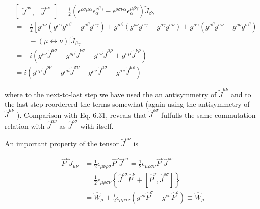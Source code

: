 \documentclass[10pt, letterpaper]{article}
\begin{document}
$$
\begin{aligned}
& {\left[\begin{array}{ll}
\tilde{J}^{\rho \sigma}, & \hat{J}^{\mu \nu}
\end{array}\right]=\frac{i}{2}\left(\epsilon^{\rho \sigma \mu \alpha} \epsilon_{\alpha}^{\nu \beta \gamma}-\epsilon^{\rho \sigma \nu \alpha} \epsilon_{\alpha}^{\mu \beta \gamma}\right) \tilde{J}_{\beta \gamma}} \\
& =-\frac{i}{2}\left[g^{\mu \nu}\left(g^{\rho \gamma} g^{\sigma \beta}-g^{\rho \beta} g^{\sigma \gamma}\right)+g^{\mu \beta}\left(g^{\rho \nu} g^{\sigma \gamma}-g^{\rho \gamma} g^{\sigma \nu}\right)+g^{\mu \gamma}\left(g^{\rho \beta} g^{\sigma \nu}-g^{\rho \nu} g^{\sigma \beta}\right)\right. \\
& \quad \quad-(\mu \leftrightarrow \nu)] \tilde{J}_{\beta \gamma} \\
& =-i\left(g^{\rho \nu} \tilde{J}^{\mu \sigma}-g^{\rho \mu} \tilde{J}^{\nu \sigma}-g^{\sigma \nu} \tilde{J}^{\mu \rho}+g^{\sigma \mu} \tilde{J}^{\nu \rho}\right) \\
& =i\left(g^{\sigma \mu} \tilde{J}^{\rho \nu}-g^{\rho \mu} \tilde{J}^{\sigma \nu}-g^{\rho \nu} \tilde{J}^{\mu \sigma}+g^{\sigma \nu} \tilde{J}^{\mu \rho}\right)
\end{aligned}
$$

where to the next-to-last step we have used the an antisymmetry of $\tilde{J}^{\mu \nu}$ and to the last step reordererd the terms somewhat (again using the antisymmetry of $\tilde{J}^{\mu \nu}$ ). Comparison with Eq. 6.31, reveals that $\tilde{J}^{\rho \sigma}$ fulfulls the same commutation relation with $\hat{J}^{\mu \nu}$ as $\hat{J}^{\rho \sigma}$ with itself.

An important property of the tensor $\tilde{J}^{\mu \nu}$ is

$$
\begin{aligned}
\hat{P}^{\nu} \tilde{J}_{\mu \nu} & =\frac{1}{2} \epsilon_{\mu \nu \rho \sigma} \hat{P}^{\nu} \hat{J}^{\rho \sigma}=\frac{1}{2} \epsilon_{\mu \rho \sigma \nu} \hat{P}^{\nu} \hat{J}^{\rho \sigma} \\
& =\frac{1}{2} \epsilon_{\mu \rho \sigma \nu}\left\{\hat{J}^{\rho \sigma} \hat{P}^{\nu}+\left[\hat{P}^{\nu}, \hat{J}^{\rho \sigma}\right]\right\} \\
& =\hat{W}_{\mu}+\frac{i}{2} \epsilon_{\mu \rho \sigma \nu}\left(g^{\nu \rho} \hat{P}^{\sigma}-g^{\nu \sigma} \hat{P}^{\rho}\right) \equiv \hat{W}_{\mu}
\end{aligned}
$$
\end{document}
